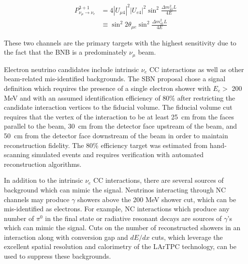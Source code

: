 \begin{equation}
    \begin{aligned}
        P_{\nu_\mu \rightarrow \nu_e}^{3+1} & = 4 \left| U_{\mu 4} \right|^2 \left| U_{e 4} \right|^2 \sin^2{\frac{\Delta m_{41}^2L}{4E}}\\
        & \equiv \sin^2{2\theta_{\mu e}} \sin^2{\frac{\Delta m_{41}^2L}{4E}}
    \end{aligned}
    \label{eq:sbn_sterile_oscillation_probability_nue_appearance}
\end{equation}

\noindent
These two channels are the primary targets with the highest sensitivity due to the fact that the BNB is a predominately $\nu_\mu$ beam.

Electron neutrino candidates include intrinsic $\nu_e$ CC interactions as well as other beam-related mis-identified backgrounds. The SBN proposal \cite{Acciarri2015} chose a signal definition which requires the presence of a single electron shower with $E_e >$ 200 MeV and with an assumed identification efficiency of 80\% after restricting the candidate interaction vertices to the fiducial volume. The fiducial volume cut requires that the vertex of the interaction to be at least \qty[mode=text]{25}{cm} from the faces parallel to the beam, \qty[mode=text]{30}{cm} from the detector face upstream of the beam, and \qty[mode=text]{50}{cm} from the detector face downstream of the beam in order to maintain reconstruction fidelity. The 80\% efficiency target was estimated from hand-scanning simulated events and requires verification with automated reconstruction algorithms. 

In addition to the intrinsic $\nu_e$ CC interactions, there are several sources of background which can mimic the signal. Neutrinos interacting through NC channels may produce $\gamma$ showers above the 200 MeV shower cut, which can be mis-identified as electrons. For example, NC interactions which produce any number of $\pi^0$ in the final state or radiative resonant decays are sources of $\gamma$'s which can mimic the signal. Cuts on the number of reconstructed showers in an interaction along with conversion gap and $dE/dx$ cuts, which leverage the excellent spatial resolution and calorimetry of the LArTPC technology, can be used to suppress these backgrounds. 

